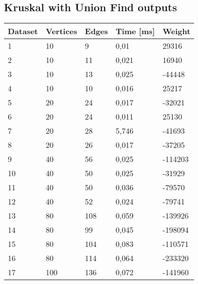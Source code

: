 \subsection{Kruskal with Union Find outputs}
\begin{longtable}{lllll}
    \textbf{Dataset} & \textbf{Vertices} & \textbf{Edges} & \textbf{Time [ms]} & \textbf{Weight} \\
    \endhead
    1                & 10             & 9              & 0,01        & 29316           \\
    2                & 10             & 11             & 0,021       & 16940           \\
    3                & 10             & 13             & 0,025       & -44448          \\
    4                & 10             & 10             & 0,016       & 25217           \\
    5                & 20             & 24             & 0,017       & -32021          \\
    6                & 20             & 24             & 0,011       & 25130           \\
    7                & 20             & 28             & 5,746       & -41693          \\
    8                & 20             & 26             & 0,017       & -37205          \\
    9                & 40             & 56             & 0,025       & -114203         \\
    10               & 40             & 50             & 0,025       & -31929          \\
    11               & 40             & 50             & 0,036       & -79570          \\
    12               & 40             & 52             & 0,024       & -79741          \\
    13               & 80             & 108            & 0,059       & -139926         \\
    14               & 80             & 99             & 0,045       & -198094         \\
    15               & 80             & 104            & 0,083       & -110571         \\
    16               & 80             & 114            & 0,064       & -233320         \\
    17               & 100            & 136            & 0,072       & -141960         \\

\end{longtable}
